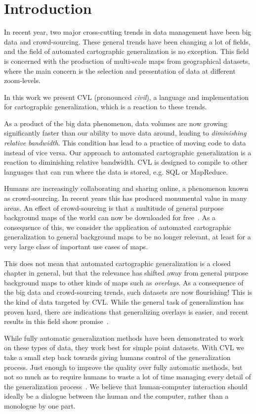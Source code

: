 \section{Introduction}
In recent year, two major cross-cutting trends in data management have been  big data and crowd-sourcing. These general trends have been changing a lot of fields, and the field of automated cartographic generalization is no exception. This field is concerned with the production of multi-scale maps from geographical datasets, where the main concern is the selection and presentation of data at different zoom-levels.

In this work we present CVL (pronounced \emph{civil}), a language and implementation for cartographic generalization, which is a reaction to these trends.

As a product of the big data phenomenon, data volumes are now growing significantly faster than our ability to move data around, leading to \emph{diminishing relative bandwidth}. This condition has lead to a practice of moving code to data instead of vice versa. Our approach to automated cartographic generalization is a reaction to diminishing relative bandwidth. CVL is designed to compile to other languages that can run where the data is stored, e.g. SQL or MapReduce.

Humans are increasingly collaborating and sharing online, a phenomenon known as crowd-sourcing. In recent years this has produced monumental value in many areas. An effect of crowd-sourcing is that a multitude of general purpose background maps of the world can now be downloaded for free~\cite{openstreetmap,googlemaps,bingmaps}. As a consequence of this, we consider the application of automated cartographic generalization to general background maps to be no longer relevant, at least for a very large class of important use cases of maps.

This does not mean that automated cartographic generalization is a closed chapter in general, but that the relevance has shifted away from general purpose background maps to other kinds of maps such as \emph{overlays}. As a consequence of the big data and crowd-sourcing trends, such datasets are now flourishing! This is the kind of data targeted by CVL. While the general task of generalization has proven hard, there are indications that generalizing overlays is easier, and recent results in this field show promise~\cite{fusiontables,thatotherpaper}. 

While fully automatic generalization methods have been demonstrated to work on these types of data, they work best for simple point datasets. With CVL we take a small step back towards giving humans control of the generalization process. Just enough to improve the quality over fully automatic methods, but not so much as to require humans to waste a lot of time managing every detail of the generalization process~\cite{fme}. We believe that human-computer interaction should ideally be a dialogue between the human and the computer, rather than a monologue by one part.

